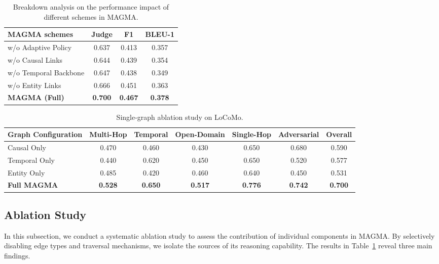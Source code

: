 \documentclass[11pt]{article}
\begin{document}

\begin{table}[!t]
\centering
\small
\caption{Breakdown analysis on the performance impact of different schemes in MAGMA.}
\label{tab:ablation}
\begin{tabular}{l|ccc}
\toprule
MAGMA schemes & {Judge} & {F1} & {BLEU-1} \\
\midrule
w/o Adaptive Policy & 0.637 & 0.413 & 0.357 \\
w/o Causal Links & 0.644 & 0.439 & 0.354 \\
w/o Temporal Backbone & 0.647 & 0.438 & 0.349 \\
w/o Entity Links & 0.666 & 0.451 & 0.363 \\
\midrule
 \textbf{MAGMA (Full)} & \textbf{0.700} & \textbf{0.467} & \textbf{0.378} \\
\bottomrule
\end{tabular}
\end{table}

\begin{table}[t]
\centering
\small
\caption{Single-graph ablation study on LoCoMo.}
\label{tab:single_graph_ablation}
\begin{tabular}{l|ccccc|c}
\toprule
Graph Configuration & Multi-Hop & Temporal & Open-Domain & Single-Hop & Adversarial & Overall \\
\midrule
Causal Only   & 0.470 & 0.460 & 0.430 & 0.650 & 0.680 & 0.590 \\
Temporal Only & 0.440 & 0.620 & 0.450 & 0.650 & 0.520 & 0.577 \\
Entity Only   & 0.485 & 0.420 & 0.460 & 0.640 & 0.450 & 0.531 \\
\midrule
\textbf{Full MAGMA} & \textbf{0.528} & \textbf{0.650} & \textbf{0.517} & \textbf{0.776} & \textbf{0.742} & \textbf{0.700} \\
\bottomrule
\end{tabular}
\end{table}


\subsection{Ablation Study}
\label{sec:rq4}
In this subsection, we conduct a systematic ablation study to assess the contribution of individual components in MAGMA. By selectively disabling edge types and traversal mechanisms, we isolate the sources of its reasoning capability. The results in Table~\ref{tab:ablation} reveal three main findings.
\end{document}
